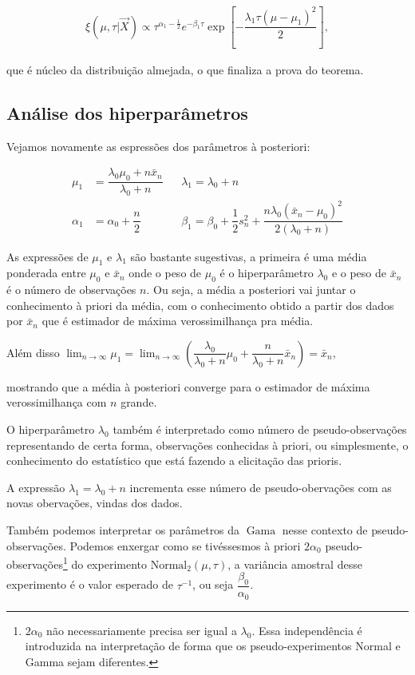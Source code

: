 \documentclass[a4paper]{article}
\newcommand{\op}[1]{{\operatorname{#1}}}
\newcommand{\vX}{\vec X}
\newcommand{\xn}{\bar{x}_n}
\newcommand{\sn}{s^2_n}
\begin{document}
\begin{align}\xi(\mu,\tau|\vX)\propto \tau^{\alpha_1-\frac12}e^{-\beta_1\tau}\exp{\left[-\dfrac{\lambda_1\tau(\mu-\mu_1)^2}{2}\right]},\label{posteriori}\end{align}

que é núcleo da distribuição almejada, o que finaliza a prova do teorema.

\vspace{1cm}

\subsection{Análise dos hiperparâmetros}

Vejamos novamente as espressões dos parâmetros à posteriori:

\begin{align*}
\mu_1&=\dfrac{\lambda_0\mu_0+n\xn}{\lambda_0+n}&&\lambda_1=\lambda_0+n\\
\alpha_1&=\alpha_0+\dfrac n 2&&\beta_1=\beta_0+\dfrac12\sn+\dfrac{n\lambda_0(\xn-\mu_0)^2}{2(\lambda_0+n)}
\end{align*}

As expressões de $\mu_1$ e $\lambda_1$ são bastante sugestivas, a primeira é uma média ponderada entre $\mu_0$ e $\xn$ onde o peso de $\mu_0$ é o hiperparâmetro $\lambda_0$ e o peso de $\xn$ é o número de observações $n$. Ou seja, a média a posteriori vai juntar o conhecimento à priori da média, com o conhecimento obtido a partir dos dados por $\xn$ que é estimador de máxima verossimilhança pra média.

Além disso $\displaystyle\lim_{n\to\infty}\mu_1=\lim_{n\to\infty}\left(\dfrac{\lambda_0}{\lambda_0+n}\mu_0+\dfrac{n}{\lambda_0+n}\xn\right)=\xn,$

mostrando que a média à posteriori converge para o estimador de máxima verossimilhança com $n$ grande.

O hiperparâmetro $\lambda_0$ também é interpretado como número de pseudo-observações\citep{wiki:Normal-gamma_distribution} representando de certa forma, observações conhecidas à priori, ou simplesmente, o conhecimento do estatístico que está fazendo a elicitação das prioris.

A expressão $\lambda_1=\lambda_0+n$ incrementa esse número de pseudo-obervações com as novas obervações, vindas dos dados.

Também podemos interpretar os parâmetros da $\op{Gama}$ nesse contexto de pseudo-observações\citep{wiki:Normal-gamma_distribution}. Podemos enxergar como se tivéssesmos à priori $2\alpha_0$ pseudo-observações\footnote{$2\alpha_0$ não necessariamente precisa ser igual a $\lambda_0$. Essa independência é introduzida na interpretação de forma que os pseudo-experimentos Normal e Gamma sejam diferentes.} do experimento $\op{Normal_2}(\mu,\tau)$, a variância amostral desse experimento é o valor esperado de $\tau^{-1}$, ou seja $\dfrac{\beta_0}{\alpha_0}$. 
\end{document}
